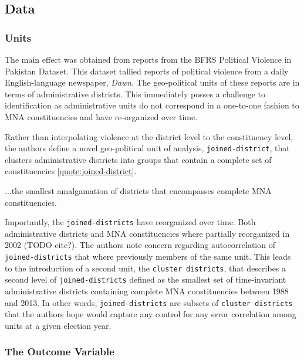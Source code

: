 \documentclass{scrartcl}
\begin{document}
\subsection{Data} \label{data}


\subsubsection{Units} \label{unit}
The main effect was obtained from reports from the BFRS Political Violence in Pakistan Dataset. This dataset tallied reports of political violence from a daily English-language newspaper, \textit{Dawn}. The geo-political units of these reports are in terms of administrative districts. This immediately posses a challenge to identification as administrative units do not correspond in a one-to-one fashion to MNA constituencies and have re-organized over time.

Rather than interpolating violence at the district level to the constituency level, the authors define a novel geo-political unit of analysis, \texttt{joined-district}, that clusters administrative districts into groups that contain a complete set of constituencies \ref{quote:joined-district}.

\begin{displayquote} \label{quote:joined-district}
  ...the smallest amalgamation of districts that encompasses complete MNA constituencies. 
\end{displayquote}

Importantly, the \texttt{joined-districts} have reorganized over time.
Both administrative districts and MNA constituencies where partially reorganized in 2002 (TODO cite?).
The authors note concern regarding autocorrelation of \texttt{joined-districts} that where previously members of the same unit. 
This leads to the introduction of a second unit, the \texttt{cluster districts}, that describes a second level of \texttt{joined-districts} defined as the smallest set of time-invariant administrative districts containing complete MNA constituencies between 1988 and 2013.
In other words, \texttt{joined-districts} are subsets of \texttt{cluster districts} that the authors hope would capture any control for any error correlation among units at a given election year.


\subsubsection{The Outcome Variable} \label{outcome}
\end{document}
